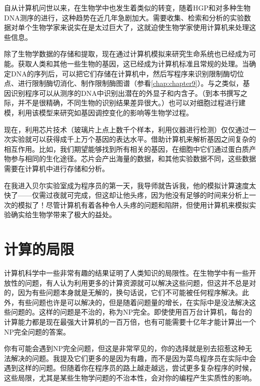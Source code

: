 自从计算机问世以来，在生物学中也发生着类似的转变，随着HGP和对多种生物DNA测序的进行，这种趋势在近几年急剧加大。需要收集、检索和分析的实验数据对单个生物学家来说实在是太过巨大了，这就迫使生物学家使用计算机来处理这些信息。

除了生物学数据的存储和提取，现在通过计算机模拟来研究生命系统也已经成为可能。获取人类和其他一些生物的基因，这已经成为计算机标准且常规的处理。当确定DNA的序列后，可以把它们存储在计算机中，然后写程序来识别限制酶切位点、进行限制酶切消化、制作限制酶图谱（参看\autoref{chap:chapter9}）。与之类似，基因识别程序可以从测序的DNA中识别出潜在的外显子和内含子。（到本书撰写之际，并不是很精确，不同生物的识别结果差异很大。）也可以对细胞过程进行建模，利用该模型来研究如基因调控变化的影响等生物学过程。

现在，利用芯片技术（玻璃片上点上数千个样本，利用仪器进行检测）仅仅通过一次实验就可以获得成千上万个基因的表达水平。借助计算机来解析基因之间复杂的相互作用。比如，我们期望能够找到所有相关的基因，在细胞中它们通过蛋白质产物参与相同的生化途径。芯片会产出海量的数据，和其他实验数据不同，这些数据需要在计算机中进行存储和分析。

在我进入贝尔实验室成为程序员的第一天，我导师就告诉我，他的模拟计算速度太快了——仅需过夜就可完成，但这却让他头疼，因为他没有足够的时间来分析上一次的模拟了！尽管计算机有着各种令人头疼的问题和陷阱，但使用计算机来模拟实验确实给生物学带来了极大的益处。

\section{计算的局限}
计算机科学中一些非常有趣的结果证明了人类知识的局限性。在生物学中有一些开放性的问题，有人认为利用更多的计算资源就可以解决这些问题，但这并不总是对的，因为有些问题本身就是无解的，换句话说，它们不可能被任何程序解决。此外，有些问题也许是可以解决的，但是随着问题量的增长，在实际中是没法解决这些问题的。这样的问题是不治的，称为NP完全。即使使用百万台计算机，每台的计算能力都是现在最强大计算机的一百万倍，也有可能需要十亿年才能计算出一个NP完全问题的答案。

你有可能会遇到NP完全问题，但这是非常罕见的，你的选择就是别去招惹这种无法解决的问题。我提及它们更多的是因为有趣，而不是因为菜鸟程序员在实际中会遇到这样的问题。但随着你在程序员的路上越走越远，尝试更多复杂程序的时候，这些局限，尤其是某些生物学问题的不治本性，会对你的编程产生实质性的影响。
